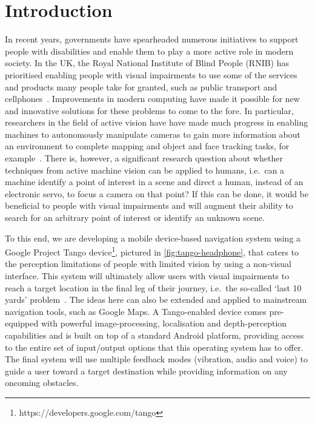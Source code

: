 \documentclass[sigconf, review=true, screen=true, anonymous=true]{acmart}
\begin{document}


\maketitle
\renewcommand{\shortauthors}{JC Lock et al.}

\section{Introduction}

In recent years, governments have spearheaded numerous initiatives to support people with disabilities and enable them to play a more active role in modern society.
In the UK, the Royal National Institute of Blind People (RNIB) has prioritised enabling people with visual impairments to use some of the services and products many people take for granted, such as public transport and cellphones~\cite{rnib-objectives}.
Improvements in modern computing have made it possible for new and innovative solutions for these problems to come to the fore.
In particular, researchers in the field of active vision have have made much progress in enabling machines to autonomously manipulate cameras to gain more information about an environment to complete mapping and object and face tracking tasks, for example~\cite{bajcsy2018revisiting}.
There is, however, a significant research question about whether techniques from active machine vision can be applied to humans, i.e.\ can a machine identify a point of interest in a scene and direct a human, instead of an electronic servo, to focus a camera on that point?
If this can be done, it would be beneficial to people with visual impairments and will augment their ability to search for an arbitrary point of interest or identify an unknown scene. 

To this end, we are developing a mobile device-based navigation system using a Google Project Tango device\footnote{https://developers.google.com/tango}, pictured in \cref{fig:tango-headphone}, that caters to the perception limitations of people with limited vision by using a non-visual interface.
This system will ultimately allow users with visual impairments to reach a target location in the final leg of their journey, i.e.\ the so-called `last 10 yards' problem~\cite{google2016blind,bellotto2013}. 
The ideas here can also be extended and applied to mainstream navigation tools, such as Google Maps.
A Tango-enabled device comes pre-equipped with powerful image-processing, localisation and depth-perception capabilities and is built on top of a standard Android platform, providing access to the entire set of input/output options that this operating system has to offer.
The final system will use multiple feedback modes (vibration, audio and voice) to guide a user toward a target destination while providing information on any oncoming obstacles.
\end{document}
